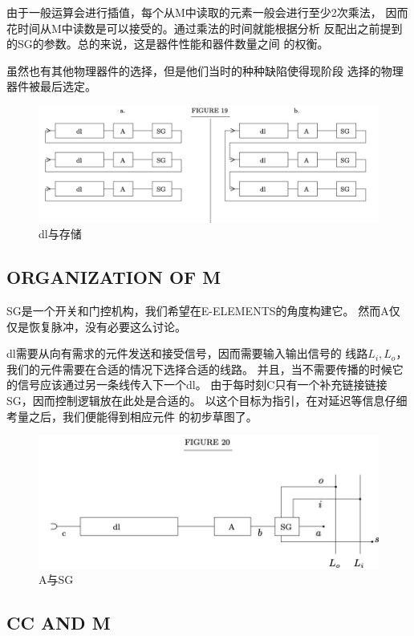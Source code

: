 \documentclass[UTF8]{ctexart}
\begin{document}
由于一般运算会进行插值，每个从M中读取的元素一般会进行至少2次乘法，
因而花时间从M中读数是可以接受的。通过乘法的时间就能根据分析
反配出之前提到的SG的参数。总的来说，这是器件性能和器件数量之间
的权衡。

虽然也有其他物理器件的选择，但是他们当时的种种缺陷使得现阶段
选择的物理器件被最后选定。

\begin{figure}[H]
\centering
\includegraphics[width=\textwidth]{./pics/16.jpeg}
\caption{dl与存储}
\end{figure}

\subsection{ORGANIZATION OF M}

SG是一个开关和门控机构，我们希望在E-ELEMENTS的角度构建它。
然而A仅仅是恢复脉冲，没有必要这么讨论。

dl需要从向有需求的元件发送和接受信号，因而需要输入输出信号的
线路$L_i, L_o$，我们的元件需要在合适的情况下选择合适的线路。
并且，当不需要传播的时候它的信号应该通过另一条线传入下一个dl。
由于每时刻C只有一个补充链接链接SG，因而控制逻辑放在此处是合适的。
以这个目标为指引，在对延迟等信息仔细考量之后，我们便能得到相应元件
的初步草图了。

\begin{figure}[H]
\centering
\includegraphics[width=\textwidth]{./pics/17.jpeg}
\caption{A与SG}
\end{figure}

\subsection{CC AND M}
\end{document}
